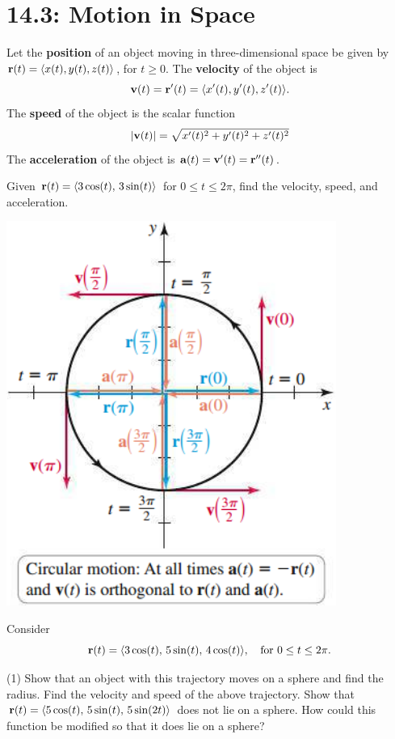 \documentclass[mathNotesPreamble]{subfiles}
\begin{document}
\section{14.3: Motion in Space}
  \begin{defn*}
    Let the \textbf{position} of an object moving in three-dimensional space be given by \newline${\mathbf{r}}(t)={\left\langle x(t),y(t),z(t) \right\rangle}$, for $t\geq 0$. The \textbf{velocity} of the object is
      \[{\mathbf{v}}(t)={\mathbf{r}}'(t)={\left\langle x'(t),y'(t),z'(t) \right\rangle}.\]
    The \textbf{speed} of the object is the scalar function
      \[{\left\vert{\mathbf{v}}(t)\right\vert}=\sqrt{x'(t)^2+y'(t)^2+z'(t)^2}\]
    The \textbf{acceleration} of the object is $\mathbf a(t)={\mathbf{v}}'(t)={\mathbf{r}}''(t)$.
  \end{defn*}
  \begin{ex*}
    Given ${\mathbf{r}}(t)={\left\langle 3\cos(t),\,3\sin(t) \right\rangle}$ for $0\leq t\leq 2\pi$, find the velocity, speed, and acceleration.
  \end{ex*}
  \begin{flushright}
    \includegraphics[width=0.35\linewidth]{images/briggs_14_03/fig14_13}
  \end{flushright}
  \pagebreak

  \noindent
  \begin{ex*}
    Consider
      \[{\mathbf{r}}(t)={\left\langle 3\cos(t),\,5\sin(t),\,4\cos(t) \right\rangle},\quad\textnormal{for } 0\leq t\leq 2\pi.\]
  \end{ex*}
  \begin{tasks}[after-item-skip=\stretch{1}](1)
    \task Show that an object with this trajectory moves on a sphere and find the radius.
    \task Find the velocity and speed of the above trajectory.
    \task Show that ${\mathbf{r}}(t)={\left\langle 5\cos(t),\,5\sin(t),\,5\sin(2t) \right\rangle}$ does not lie on a sphere. How could this function be modified so that it does lie on a sphere?
  \end{tasks}
  \pagebreak
\end{document}
